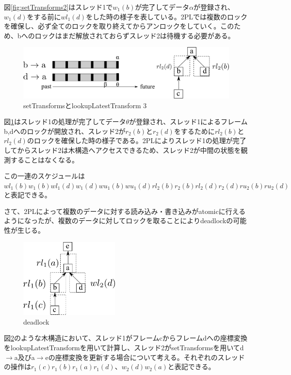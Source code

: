 \documentclass[a4paper]{jreport}	%
\begin{document}
図\ref{fig:setTransforms2}はスレッド1で$w_1(b)$が完了してデータ$\alpha$が登録され、$w_1(d)$をする前に$wl_1(d)$をした時の様子を表している。2PLでは複数のロックを確保し、必ず全てのロックを取り終えてからアンロックをしていく。このため、bへのロックはまだ解放されておらずスレッド2は待機する必要がある。


\begin{figure}[h] 
\centering
\includegraphics[width=12cm]{setTransforms3}
\caption{setTransformsとlookupLatestTransform 3}
\label{fig:setTransforms3}
\end{figure}


図\ref{fig:setTransforms3}はスレッド1の処理が完了してデータ$\theta$が登録され、スレッド1によるフレームb,dへのロックが開放され、スレッド2が$r_2(b)$と$r_2(d)$をするために$rl_2(b)$と$rl_2(d)$のロックを確保した時の様子である。2PLによりスレッド1の処理が完了してからスレッド2は木構造へアクセスできるため、スレッド2が中間の状態を観測することはなくなる。

この一連のスケジュールは$wl_1(b)w_1(b)wl_1(d)w_1(d)wu_1(b)wu_1(d)rl_2(b)r_2(b)rl_2(d)r_2(d)ru_2(b)ru_2(d)$と表記できる。

さて、2PLによって複数のデータに対する読み込み・書き込みがatomicに行えるようになったが、複数のデータに対してロックを取ることによりdeadlockの可能性が生じる。


\begin{figure}[h] 
\centering
\includegraphics[width=5cm]{deadlock}
\caption{deadlock}
\label{fig:deadlock}
\end{figure}

図\ref{fig:deadlock}のような木構造において、スレッド1がフレームcからフレームdへの座標変換をlookupLatestTransformを用いて計算し、スレッド2がsetTransformsを用いてd$\rightarrow$a及びa$\rightarrow$eの座標変換を更新する場合について考える。それぞれのスレッドの操作は$r_1(c)r_1(b)r_1(a)r_1(d)$、$w_2(d)w_2(a)$と表記できる。
\end{document}
